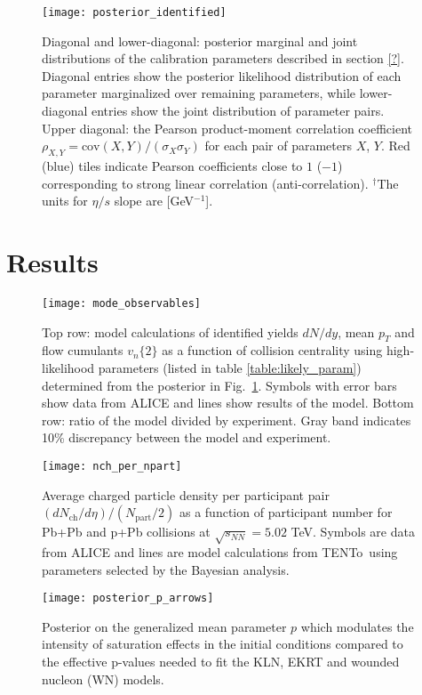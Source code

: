 \documentclass[aps,prc,reprint,amsmath,nofootinbib]{revtex4-1}
\newcommand{\trento}{T\raisebox{-0.5ex}{R}ENTo}
\newcommand{\nch}{N_\text{ch}}
\newcommand{\npart}{N_\text{part}}
\newcommand{\sqrts}{\sqrt{s_{NN}}}
\begin{document}
\begin{figure*}
    \texttt{[image: posterior\_identified]}
    \caption{Diagonal and lower-diagonal: posterior marginal and joint distributions of the calibration parameters described in section \ref{?}. Diagonal entries show the posterior likelihood distribution of each parameter marginalized over remaining parameters, while lower-diagonal entries show the joint distribution of parameter pairs. Upper diagonal: the Pearson product-moment correlation coefficient $\rho_{X,Y}=\text{cov}(X,Y)/(\sigma_X \sigma_Y)$ for each pair of parameters $X$, $Y$. Red (blue) tiles indicate Pearson coefficients close to $1$ ($-1$) corresponding to strong linear correlation (anti-correlation). $^\dagger$The units for $\eta/s$ slope are [GeV$^{-1}$].}
    \label{fig:posterior_identified}
\end{figure*}

\section{Results}


\begin{figure*}
    \texttt{[image: mode\_observables]}
    \caption{Top row: model calculations of identified yields $dN/dy$, mean $p_T$ and flow cumulants $v_n\{2\}$ as a function of collision centrality using high-likelihood parameters (listed in table \ref{table:likely_param}) determined from the posterior in Fig.~\ref{fig:posterior_identified}. Symbols with error bars show data from ALICE and lines show results of the model. Bottom row: ratio of the model divided by experiment. Gray band indicates 10\% discrepancy between the model and experiment.}
    \label{fig:mode_observables}
\end{figure*}


\begin{figure}
    \texttt{[image: nch\_per\_npart]}
    \caption{Average charged particle density per participant pair $(d\nch/d\eta)/(\npart/2)$ as a function of participant number for Pb+Pb and p+Pb collisions at $\sqrts=5.02$ TeV.
    Symbols are data from ALICE and lines are model calculations from \protect\trento\ using parameters selected by the Bayesian analysis.}
\end{figure}

\begin{figure}
    \centering
    \texttt{[image: posterior\_p\_arrows]}
    \caption{Posterior on the generalized mean parameter $p$ which modulates the intensity of saturation effects in the initial conditions compared to the effective p-values needed to fit
    the KLN, EKRT and wounded nucleon (WN) models.}
    \label{posterior_p_arrows}
\end{figure}
\end{document}
